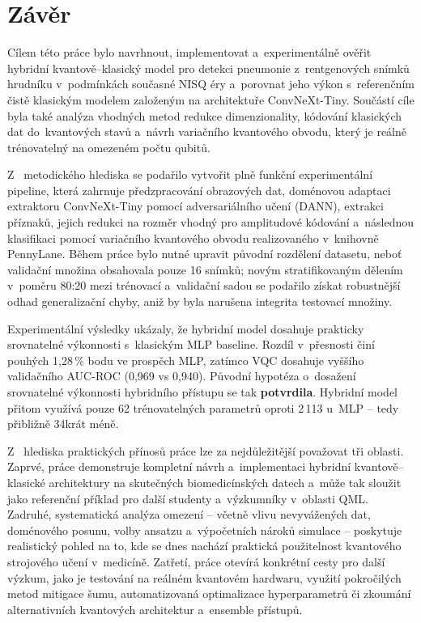 \documentclass[12pt, a4paper]{report}
\begin{document}
\chapter{Závěr} \label{chap:zaver}

Cílem této práce bylo navrhnout, implementovat a~experimentálně ověřit hybridní kvantově–klasický model pro detekci pneumonie z~rentgenových snímků hrudníku v~podmínkách současné NISQ éry a~porovnat jeho výkon s~referenčním čistě klasickým modelem založeným na architektuře ConvNeXt-Tiny. Součástí cíle byla také analýza vhodných metod redukce dimenzionality, kódování klasických dat do~kvantových stavů a~návrh variačního kvantového obvodu, který je reálně trénovatelný na omezeném počtu qubitů. 

Z ~metodického hlediska se podařilo vytvořit plně funkční experimentální pipeline, která zahrnuje předzpracování obrazových dat, doménovou adaptaci extraktoru ConvNeXt-Tiny pomocí adversariálního učení (DANN), extrakci příznaků, jejich redukci na rozměr vhodný pro amplitudové kódování a~následnou klasifikaci pomocí variačního kvantového obvodu realizovaného v~knihovně PennyLane. Během práce bylo nutné upravit původní rozdělení datasetu, neboť validační množina obsahovala pouze 16 snímků; novým stratifikovaným dělením v~poměru 80:20 mezi trénovací a~validační sadou se podařilo získat robustnější odhad generalizační chyby, aniž by byla narušena integrita testovací množiny.

Experimentální výsledky ukázaly, že hybridní model dosahuje prakticky srovnatelné výkonnosti s~klasickým MLP baseline. Rozdíl v~přesnosti činí pouhých 1{,}28\,\% bodu ve prospěch MLP, zatímco VQC dosahuje vyššího validačního AUC-ROC (0{,}969 vs 0{,}940). Původní hypotéza o~dosažení srovnatelné výkonnosti hybridního přístupu se tak \textbf{potvrdila}. Hybridní model přitom využívá pouze 62 trénovatelných parametrů oproti 2\,113 u~MLP -- tedy přibližně 34krát méně.

Z ~hlediska praktických přínosů práce lze za nejdůležitější považovat tři oblasti. Zaprvé, práce demonstruje kompletní návrh a~implementaci hybridní kvantově–klasické architektury na skutečných biomedicínských datech a~může tak sloužit jako referenční příklad pro další studenty a~výzkumníky v~oblasti QML. Zadruhé, systematická analýza omezení -- včetně vlivu nevyvážených dat, doménového posunu, volby ansatzu a~výpočetních nároků simulace -- poskytuje realistický pohled na to, kde se dnes nachází praktická použitelnost kvantového strojového učení v~medicíně. Zatřetí, práce otevírá konkrétní cesty pro další výzkum, jako je testování na reálném kvantovém hardwaru, využití pokročilých metod mitigace šumu, automatizovaná optimalizace hyperparametrů či zkoumání alternativních kvantových architektur a~ensemble přístupů.
\end{document}
